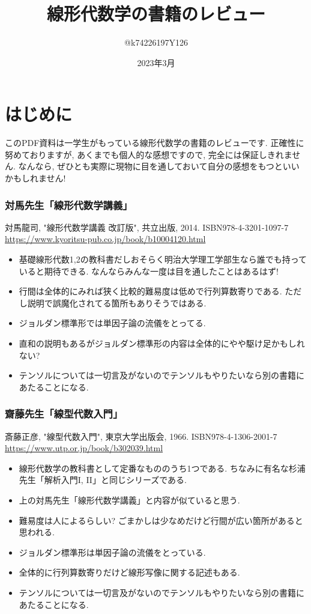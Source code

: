\documentclass[10pt,a4paper]{jsarticle}
\title{線形代数学の書籍のレビュー}
\author{@k74226197Y126}
\date{2023年3月}
\begin{document}
\maketitle
\section*{はじめに}
このPDF資料は一学生がもっている線形代数学の書籍のレビューです. 正確性に努めておりますが, あくまでも個人的な感想ですので, 完全には保証しきれません. なんなら, ぜひとも実際に現物に目を通しておいて自分の感想をもつといいかもしれません! 
\subsubsection*{対馬先生「線形代数学講義」}
対馬龍司, "線形代数学講義 改訂版", 共立出版, 2014. ISBN978-4-3201-1097-7 \url{https://www.kyoritsu-pub.co.jp/book/b10004120.html}
\begin{itemize}
    \item 基礎線形代数1,2の教科書だしおそらく明治大学理工学部生なら誰でも持っていると期待できる. なんならみんな一度は目を通したことはあるはず! 
    \item 行間は全体的にみれば狭く比較的難易度は低めで行列算数寄りである. ただし説明で誤魔化されてる箇所もありそうではある. 
    \item ジョルダン標準形では単因子論の流儀をとってる. 
    \item 直和の説明もあるがジョルダン標準形の内容は全体的にやや駆け足かもしれない? 
    \item テンソルについては一切言及がないのでテンソルもやりたいなら別の書籍にあたることになる. 
\end{itemize}
\subsubsection*{齋藤先生「線型代数入門」}
斎藤正彦, "線型代数入門", 東京大学出版会, 1966. ISBN978-4-1306-2001-7 \url{https://www.utp.or.jp/book/b302039.html}
\begin{itemize}
    \item 線形代数学の教科書として定番なもののうち1つである. ちなみに有名な杉浦先生「解析入門I, II」と同じシリーズである. 
    \item 上の対馬先生「線形代数学講義」と内容が似ていると思う. 
    \item 難易度は人によるらしい? ごまかしは少なめだけど行間が広い箇所があると思われる. 
    \item ジョルダン標準形は単因子論の流儀をとっている. 
    \item 全体的に行列算数寄りだけど線形写像に関する記述もある. 
    \item テンソルについては一切言及がないのでテンソルもやりたいなら別の書籍にあたることになる. 
\end{itemize}
\end{document}
